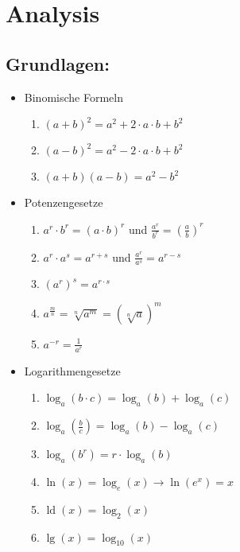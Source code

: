 \documentclass[a4paper,twocolumn,10pt]{onepgnote}
\begin{document}
\pagestyle{empty}
\section{Analysis}
\subsection{Grundlagen:}
\begin{itemize}
\item Binomische Formeln\\
\begin{enumerate}
\item $(a+b)^2 = a^2+2\cdot a\cdot b + b^2$\\
\item $(a-b)^2 = a^2 -2\cdot a\cdot b + b^2$\\
\item $(a+b)(a-b) = a^2 - b^2$
\end{enumerate}
\item Potenzengesetze\\
\begin{enumerate}
\item $a^r \cdot b^r = (a\cdot b)^r$ und $\frac{a^r}{b^r} = \left(\frac{a}{b}\right)^r$\\
\item $a^r \cdot a^s = a^{r+s}$ und $ \frac{a^r}{a^s} = a^{r-s}$\\
\item $(a^r)^s = a^{r\cdot s}$\\
\item $a^{\frac{m}{n}} = \sqrt[n]{a^m} = (\sqrt[n]{a})^m$\\
\item $a^{-r} = \frac{1}{a^r}$
\end{enumerate}
\item Logarithmengesetze\\
\begin{enumerate}
\item $\log_a(b\cdot c) = \log_a(b) + \log_a(c)$\\
\item $\log_a(\frac{b}{c}) = \log_a(b) - \log_a(c)$\\
\item $\log_a(b^r) = r\cdot \log_a(b)$\\
\item $\ln(x) = \log_e(x) \longrightarrow \ln(e^x) =x $\\
\item $\operatorname{ld}(x) = \log_2(x)$\\
\item $\operatorname{lg}(x) = \log_{10}(x)$
\end{enumerate}
\end{itemize}
\end{document}
